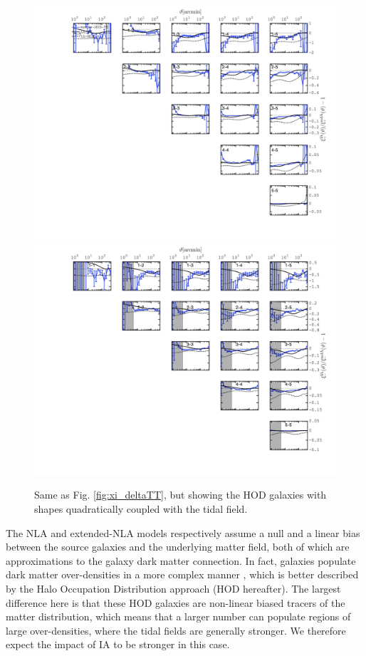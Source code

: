 \documentclass[useAMS,usenatbib]{mn2e}
\begin{document}
\begin{figure}
\includegraphics[width=\columnwidth]{graphs/frac_xip_sims_HOD_TT.jpg}
\includegraphics[width=\columnwidth]{graphs/frac_xim_sims_HOD_TT.jpg}
\caption{Same as Fig. \ref{fig:xi_deltaTT}, but showing the HOD galaxies with shapes quadratically coupled with the tidal field. }
\label{fig:xi_HOD}
\end{figure}



The NLA and extended-NLA models respectively assume a null and a linear bias between the source galaxies and the underlying matter field, both of which are approximations to the galaxy dark matter connection. In fact, galaxies populate dark matter over-densities in a more complex manner \citep{GalaxyPopulationPapers}, which is better described by the Halo Occupation Distribution approach (HOD hereafter). The largest difference here is that these HOD galaxies are non-linear biased tracers of the matter distribution, which means that a larger number can populate regions of large over-densities, where the tidal fields are generally stronger. We therefore expect the impact of IA to be stronger in this case.
\end{document}
